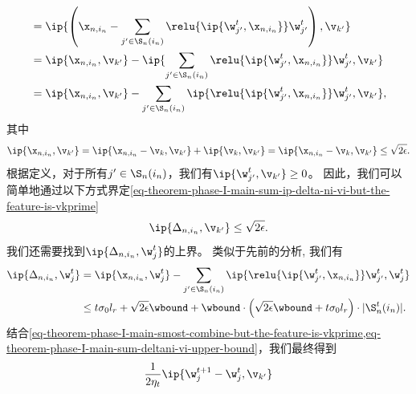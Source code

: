 \begin{myproof}
\begin{equation}
\begin{aligned}
    &= \ip{ \left(\x_{n,i_n} - \sum_{{j^{\prime}} \in \S_{n}(i_n)} \relu{\ip{\w_{j^{\prime}}^{t},\x_{n,i_n}}  } \w_{j^{\prime}}^{t} \right), \v_{k^{\prime}} } \\
    &= \ip{ \x_{n,i_n}, \v_{k^{\prime}} } - \ip{ \sum_{{j^{\prime}} \in \S_{n}(i_n)} \relu{\ip{\w_{j^{\prime}}^{t},\x_{n,i_n}}  } \w_{j^{\prime}}^{t}, \v_{k^{\prime}} } \\
    &= \ip{ \x_{n,i_n}, \v_{k^{\prime}} } -  \sum_{{j^{\prime}} \in \S_{n}(i_n)} \ip{  \relu{\ip{\w_{j^{\prime}}^{t},\x_{n,i_n}}  } \w_{j^{\prime}}^{t}, \v_{k^{\prime}} },
\end{aligned}
\end{equation}
其中
\begin{equation}
    \ip{ \x_{n,i_n}, \v_{k^{\prime}} } = \ip{ \x_{n,i_n} - \v_k, \v_{k^{\prime}} } + \ip{ \v_k, \v_{k^{\prime}} } = \ip{ \x_{n,i_n} - \v_k, \v_{k^{\prime}} } \leq \sqrt{2\epsilon}.
\end{equation}
根据定义，对于所有${j^{\prime}} \in \S_{n}(i_n)$，我们有$\ip{\w_{j^{\prime}}^{t}, \v_{k^{\prime}}} \geq 0$。
因此，我们可以简单地通过以下方式界定\cref{eq-theorem-phase-I-main-sum-ip-delta-ni-vi-but-the-feature-is-vkprime}
\begin{equation}\label{eq-theorem-phase-I-main-deltanin-vkprime}
    \ip{\Delta_{n,i_n},\v_{k^{\prime}}} 
    \leq \sqrt{2\epsilon}.
\end{equation}
我们还需要找到$\ip{\Delta_{n,i_n},\w_j^{t}}$的上界。
类似于先前的分析, 我们有
\begin{equation}\label{eq-theorem-phase-I-main-sum-deltani-vi-upper-bound}
\begin{aligned}
    \ip{\Delta_{n,i_n},\w_j^{t}} 
    &= \ip{ \x_{n,i_n}, \w_j^{t} } 
    - \sum_{j^{\prime} \in \S_{n}(i_n)} \ip{ \relu{\ip{\w_{j^{\prime}}^{t},\x_{n,i_n}}  } \w_{j^{\prime}}^{t}, \w_j^{t} } \\
    &\leq t \sigma_0 l_r + \sqrt{2\epsilon} \wbound
    + \wbound \cdot \left( 
    \sqrt{2\epsilon}\wbound + t\sigma_0 l_r \right) \cdot
    |\S_n^t(i_n)|.
\end{aligned}
\end{equation}
结合\cref{eq-theorem-phase-I-main-smost-combine-but-the-feature-is-vkprime,eq-theorem-phase-I-main-sum-deltani-vi-upper-bound}，我们最终得到
\begin{equation}\label{eq-theorem-phase-I-main-smost-result-2}
    \begin{aligned}
        & \frac{1}{2\eta_t} \ip{\w^{t+1}_j - \w^{t}_j,\v_{k^{\prime}}} \\

\end{aligned}
\end{equation}
\end{myproof}
